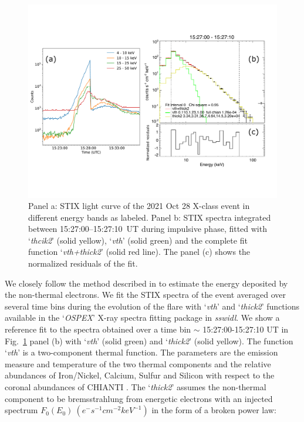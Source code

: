 \begin{figure}
    \centering
    \includegraphics[trim={0cm 3cm 1.3cm 3cm}, clip, width=\textwidth]{Figures/oct_28_lc_3.pdf}
    \caption[STIX light curve and spectra fit for the 2021 Oct 28 flare]{Panel a: STIX light curve of the 2021 Oct 28 X-class event in different energy bands as labeled. Panel b: STIX spectra integrated between 15:27:00{--}15:27:10~UT during impulsive phase, fitted with `\textit{thcik2}' (solid yellow), `\textit{vth}' (solid green) and the complete fit function `\textit{vth+thick2}' (solid red line). The panel (c) shows the normalized residuals of the fit.}
    \label{fig:stix_an}
    \end{figure}

We closely follow the method described in \cite{emslie12} to estimate the energy deposited by the non-thermal electrons. We fit the STIX spectra of the event averaged over several time bins during the evolution of the flare with `\textit{vth}' and `\textit{thick2}' functions available in the `\textit{OSPEX}' X-ray spectra fitting package in {\it sswidl}. We show a reference fit to the spectra obtained over a time bin $\sim$ 15:27:00-15:27:10 UT in Fig.~\ref{fig:stix_an} panel (b) with `\textit{vth}' (solid green) and `\textit{thick2}' (solid yellow). The function `\textit{vth}' is a two-component thermal function. The parameters are the emission measure and temperature of the two thermal components and the relative abundances of Iron/Nickel, Calcium, Sulfur and Silicon with respect to the coronal abundances of CHIANTI \citep{chianti1,chianti}. The `\textit{thick2}' assumes the non-thermal component to be bremsstrahlung from energetic electrons with an injected spectrum $F_{0}(E_{0})~(e^{-}s^{-1}cm^{-2}keV^{-1})$ in the form of a broken power law:

